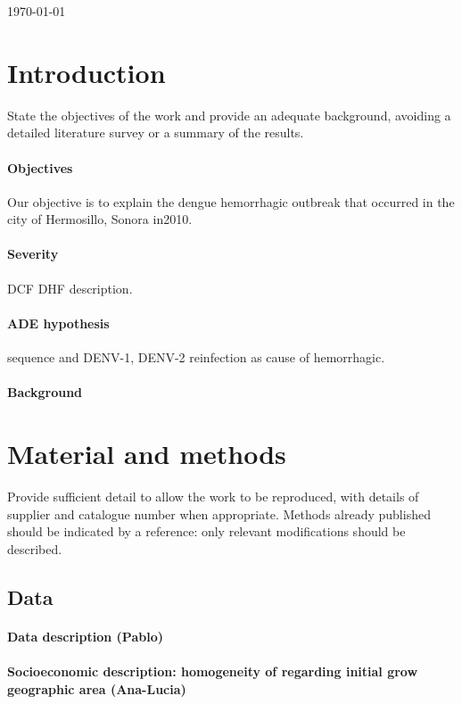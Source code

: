 \documentclass[5p, authoryear, final, sort&compress, times]{elsarticle}
\begin{document}
	\begin{frontmatter}
		
	\end{frontmatter}
	\today
    \section{Introduction} \label{intro}
		State the objectives of the work and provide an adequate 
		background, avoiding a detailed literature survey or a 
		summary of the results.

		\paragraph{Objectives}
        Our objective is to explain the dengue hemorrhagic outbreak that 
     occurred in the city of Hermosillo, Sonora in2010.
    \paragraph{Severity}
    \ac{DCF} \ac{DHF} description.
    \paragraph{ADE hypothesis}
     sequence and
     \ac{DENV-1}, \ac{DENV-2}
     reinfection as cause of hemorrhagic.
		\paragraph{Background}
        
	\section{Material and methods}
		Provide sufficient detail to allow the work to be 
		reproduced, with details of supplier and catalogue 
		number when appropriate. Methods already published 
		should be indicated by a reference: only relevant 
		modifications should be described.
		\subsection{Data}
			\paragraph{Data description (Pablo)}
			\paragraph{Socioeconomic description: 
            	homogeneity of regarding initial
                grow geographic area (Ana-Lucia)}
\end{document}
